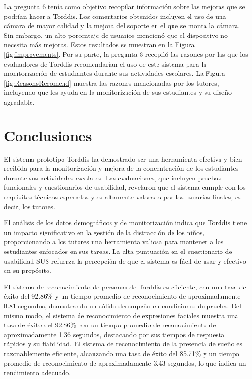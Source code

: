 \documentclass[a4paper,fleqn]{cas-sc}
\begin{document}
	La pregunta 6 tenía como objetivo recopilar información sobre las mejoras que se podrían hacer a Torddis. Los comentarios obtenidos incluyen el uso de una cámara de mayor calidad y la mejora del soporte en el que se monta la cámara. Sin embargo, un alto porcentaje de usuarios mencionó que el dispositivo no necesita más mejoras. Estos resultados se muestran en la Figura \ref{fig:Improvements}. Por su parte, la pregunta 8 recopiló las razones por las que los evaluadores de Torddis recomendarían el uso de este sistema para la monitorización de estudiantes durante sus actividades escolares. La Figura \ref{fig:ReasonsRecomend} muestra las razones mencionadas por los tutores, incluyendo que les ayuda en la monitorización de sus estudiantes y su diseño agradable.
	
	\section{Conclusiones}
	\label{seccion:Seis}
	El sistema prototipo Torddis ha demostrado ser una herramienta efectiva y bien recibida para la monitorización y mejora de la concentración de los estudiantes durante sus actividades escolares. Las evaluaciones, que incluyen pruebas funcionales y cuestionarios de usabilidad, revelaron que el sistema cumple con los requisitos técnicos esperados y es altamente valorado por los usuarios finales, es decir, los tutores.
	
	El análisis de los datos demográficos y de monitorización indica que Torddis tiene un impacto significativo en la gestión de la distracción de los niños, proporcionando a los tutores una herramienta valiosa para mantener a los estudiantes enfocados en sus tareas. La alta puntuación en el cuestionario de usabilidad SUS refuerza la percepción de que el sistema es fácil de usar y efectivo en su propósito.
	
	El sistema de reconocimiento de personas de Torddis es eficiente, con una tasa de éxito del 92.86\% y un tiempo promedio de reconocimiento de aproximadamente 0.81 segundos, demostrando un sólido desempeño en condiciones de prueba. Del mismo modo, el sistema de reconocimiento de expresiones faciales muestra una tasa de éxito del 92.86\% con un tiempo promedio de reconocimiento de aproximadamente 1.36 segundos, destacando por sus tiempos de respuesta rápidos y su fiabilidad. El sistema de reconocimiento de la presencia de sueño es razonablemente eficiente, alcanzando una tasa de éxito del 85.71\% y un tiempo promedio de reconocimiento de aproximadamente 3.43 segundos, lo que indica un rendimiento adecuado.
	
\end{document}
